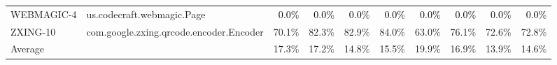 \begin{tabular}{ ll rrrr rrrr}
WEBMAGIC-4  &  us.codecraft.webmagic.Page & \cellcolor{light-gray} \textcolor{black}{0.0\%} & \cellcolor{light-gray} \textcolor{black}{0.0\%} & \cellcolor{light-gray} \textcolor{black}{0.0\%} & \cellcolor{light-gray} \textcolor{black}{0.0\%} & \cellcolor{light-gray} \textcolor{black}{0.0\%} & \cellcolor{light-gray} \textcolor{black}{0.0\%} & \cellcolor{light-gray} \textcolor{black}{0.0\%} & \cellcolor{light-gray} \textcolor{black}{0.0\%}\\ 
ZXING-10  &  com.google.zxing.qrcode.encoder.Encoder & 70.1\% & 82.3\% & 82.9\% & 84.0\% & 63.0\% & 76.1\% & 72.6\% & 72.8\%\\ 
\midrule 
Average &  &  17.3\% &  17.2\% &  14.8\% &  15.5\% &  19.9\% &  16.9\% &  13.9\% &  14.6\%\\ 
\bottomrule 
\end{tabular} 
